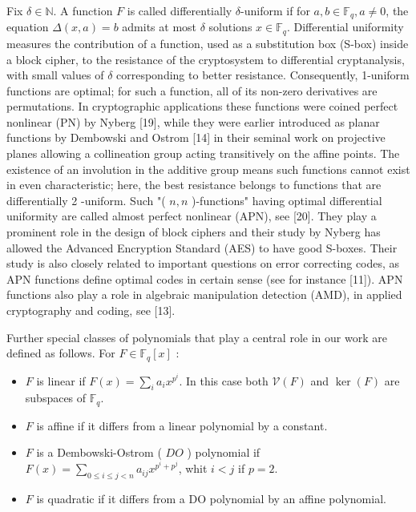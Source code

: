 \documentclass[10pt]{article}
\begin{document}
Fix $\delta \in \mathbb{N}$. A function $F$ is called differentially $\delta$-uniform if for $a, b \in \mathbb{F}_{q}, a \neq 0$, the equation $\Delta(x, a)=b$ admits at most $\delta$ solutions $x \in \mathbb{F}_{q}$. Differential uniformity measures the contribution of a function, used as a substitution box (S-box) inside a block cipher, to the resistance of the cryptosystem to differential cryptanalysis, with small values of $\delta$ corresponding to better resistance. Consequently, 1-uniform functions are optimal; for such a function, all of its non-zero derivatives are permutations. In cryptographic applications these functions were coined perfect nonlinear (PN) by Nyberg [19], while they were earlier introduced as planar functions by Dembowski and Ostrom [14] in their seminal work on projective planes allowing a collineation group acting transitively on the affine points. The existence of an involution in the additive group means such functions cannot exist in even characteristic; here, the best resistance belongs to functions that are differentially 2 -uniform. Such "( $n, n$ )-functions" having optimal differential uniformity are called almost perfect nonlinear (APN), see [20]. They play a prominent role in the design of block ciphers and their study by Nyberg has allowed the Advanced Encryption Standard (AES) to have good S-boxes. Their study is also closely related to important questions on error correcting codes, as APN functions define optimal codes in certain sense (see for instance [11]). APN functions also play a role in algebraic manipulation detection (AMD), in applied cryptography and coding, see [13].

Further special classes of polynomials that play a central role in our work are defined as follows. For $F \in \mathbb{F}_{q}[x]$ :

\begin{itemize}
  \item $F$ is linear if $F(x)=\sum_{i} a_{i} x^{p^{i}}$. In this case both $\mathcal{V}(F)$ and $\operatorname{ker}(F)$ are subspaces of $\mathbb{F}_{q}$.
  \item $F$ is affine if it differs from a linear polynomial by a constant.
  \item $F$ is a Dembowski-Ostrom ( $D O$ ) polynomial if $F(x)= \sum_{0 \leq i \leq j<n} a_{i j} x^{p^{i}+p^{j}}$, whit $i<j$ if $p=2$.
  \item $F$ is quadratic if it differs from a DO polynomial by an affine polynomial.
\end{itemize}
\end{document}
